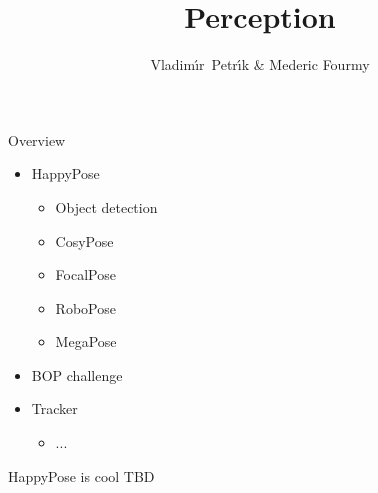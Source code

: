 \documentclass{agimusslidesschool}
\title{Perception}
\author{Vladim\'{\i}r~Petr\'{\i}k \& Mederic Fourmy}
\institute{Czech Technical University in Prague}
\begin{document}
    \agimustitleframe

    \begin{frame}{Overview}
        \begin{itemize}
            \item HappyPose
            \begin{itemize}
                \item Object detection
                \item CosyPose
                \item FocalPose
                \item RoboPose
                \item MegaPose
            \end{itemize}
            \item BOP challenge
            \item Tracker
            \begin{itemize}
                \item ...
            \end{itemize}
        \end{itemize}
    \end{frame}

    \begin{frame}{HappyPose is cool}
        TBD
    \end{frame}

\end{document}
